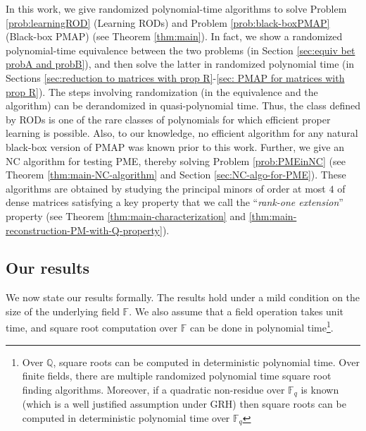 \documentclass[11pt,letterpaper]{article}
\newcommand{\F}{\mathbb{F}}
\newcommand{\Q}{\mathbb{Q}}
\begin{document}
In this work, we give randomized polynomial-time algorithms to solve Problem \ref{prob:learningROD} (Learning RODs) and Problem \ref{prob:black-boxPMAP} (Black-box PMAP) (see Theorem \ref{thm:main}). In fact, we show a randomized polynomial-time equivalence between the two problems (in Section \ref{sec:equiv bet probA and probB}), and then solve the latter in randomized polynomial time (in Sections \ref{sec:reduction to matrices with prop R}-\ref{sec: PMAP for matrices with prop R}). The steps involving randomization (in the equivalence and the algorithm) can be derandomized in quasi-polynomial time. Thus, the class defined by RODs is one of the rare classes of polynomials for which efficient proper learning is possible. Also, to our knowledge, no efficient algorithm for any natural black-box version of PMAP was known prior to this work. Further, we give an NC algorithm for testing PME, thereby solving Problem \ref{prob:PMEinNC} (see Theorem \ref{thm:main-NC-algorithm} and Section \ref{sec:NC-algo-for-PME}). These algorithms are obtained by studying the principal minors of order at most $4$ of dense matrices satisfying a key property that we call the ``\emph{rank-one extension}'' property (see Theorem \ref{thm:main-characterization} and \ref{thm:main-reconstruction-PM-with-Q-property}). 

\subsection{Our results} \label{sec:results}
We now state our results formally. The results hold under a mild condition on the size of the underlying field $\F$. We also assume that a field operation takes unit time, and square root computation over $\F$ can be done in polynomial time\footnote{Over $\mathbb{Q}$, square roots can be computed in deterministic polynomial time. Over finite fields, there are multiple randomized polynomial time square root finding algorithms. Moreover, if a quadratic non-residue over $\mathbb{F}_q$ is known (which is a well justified assumption under GRH) then square roots can be computed in deterministic polynomial time over $\mathbb{F}_q$}.  %
\end{document}
